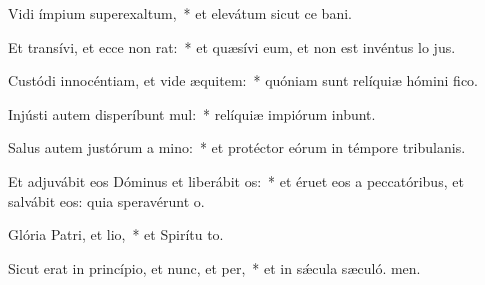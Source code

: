 \item Vidi ímpium superexaltum,~* et elevátum sicut ce bani.
\item Et transívi, et ecce non rat:~* et quæsívi eum, et non est invéntus lo jus.
\item Custódi innocéntiam, et vide æquitem:~* quóniam sunt relíquiæ hómini fico.
\item Injústi autem disperíbunt mul:~* relíquiæ impiórum inbunt.
\item Salus autem justórum a mino:~* et protéctor eórum in témpore tribulanis.
\item Et adjuvábit eos Dóminus et liberábit os:~* et éruet eos a peccatóribus, et salvábit eos: quia speravérunt  o.
\item Glória Patri, et lio,~* et Spirítu to.
\item Sicut erat in princípio, et nunc, et per,~* et in sǽcula sæculó. men.
